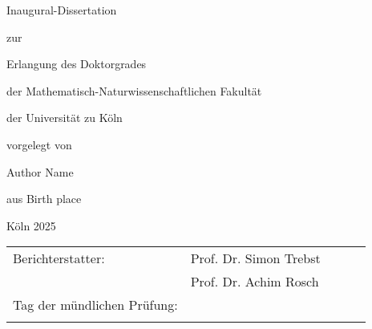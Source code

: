\begin{titlepage}
\renewcommand{\footnotesize}{\small}
\renewcommand{\footnoterule}{\relax}

\thispagestyle{empty}
\renewcommand{\baselinestretch}{1} 
\begin{center}
	{\vspace*{1mm} \Huge {\color{maincolor2} } \par}
	{ \Large \vspace*{20mm} {\LARGE \mainsemibold Inaugural-Dissertation} \par \vspace*{4mm} zur \par \vspace*{4mm} Erlangung des Doktorgrades \par \vspace*{4mm} der Mathematisch-Naturwissenschaftlichen Fakultät \par \vspace*{4mm} der Universität zu Köln \par \vspace*{4mm} vorgelegt von \par  \vspace*{15mm}}
	{{\LARGE \mainsemibold Author Name} \par \vspace*{10mm}}
	{\large \vspace*{1ex} aus Birth place \par \vspace*{1ex}}
	{\large K\"oln 2025}
\end{center}
\end{titlepage}


\thispagestyle{empty}
\begin{center}
\setlength{\tabcolsep}{2em} %
\begin{tabular}{lllll}
	Berichterstatter:           & Prof. Dr. Simon Trebst &  &  &  \\[1em]
	& Prof. Dr. Achim Rosch  &  &  &  \\[2em]
	Tag der mündlichen Prüfung: &             &  &  &  \\
	&                        &  &  & 
\end{tabular}
\end{center}